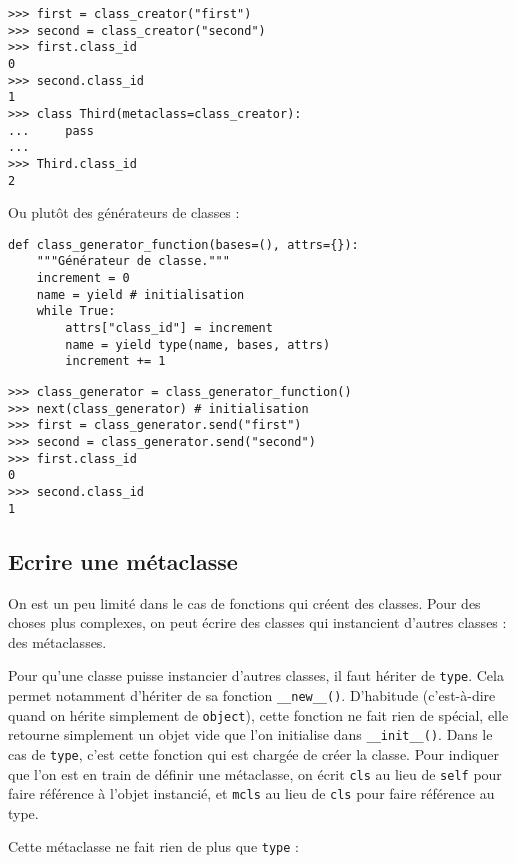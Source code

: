 \begin{verbatim}
>>> first = class_creator("first")
>>> second = class_creator("second")
>>> first.class_id
0
>>> second.class_id
1
>>> class Third(metaclass=class_creator):
...     pass
...
>>> Third.class_id
2
\end{verbatim}

Ou plutôt des générateurs de classes :

\begin{verbatim}
def class_generator_function(bases=(), attrs={}):
    """Générateur de classe."""
    increment = 0
    name = yield # initialisation
    while True:
        attrs["class_id"] = increment
        name = yield type(name, bases, attrs)
        increment += 1
\end{verbatim}

\begin{verbatim}
>>> class_generator = class_generator_function()
>>> next(class_generator) # initialisation
>>> first = class_generator.send("first")
>>> second = class_generator.send("second")
>>> first.class_id
0
>>> second.class_id
1
\end{verbatim}

\subsection{Ecrire une métaclasse}

On est un peu limité dans le cas de fonctions qui créent des classes. Pour des choses plus complexes, on peut écrire
des classes qui instancient d'autres classes : des métaclasses.\medskip

Pour qu'une classe puisse instancier d'autres classes, il faut hériter de \texttt{type}. Cela permet notamment d'hériter de sa fonction \texttt{__new__()}. D'habitude (c'est-à-dire quand on hérite simplement de \texttt{object}), cette fonction ne fait rien de spécial, elle retourne simplement un objet vide que l'on initialise dans \texttt{__init__()}. Dans le cas de \texttt{type}, c'est cette fonction qui est chargée de créer la classe. Pour indiquer que l'on est en train de définir une métaclasse, on écrit \texttt{cls} au lieu de \texttt{self} pour faire référence à l'objet instancié, et \texttt{mcls} au lieu de \texttt{cls} pour faire référence au type.\medskip

Cette métaclasse ne fait rien de plus que \texttt{type} :


